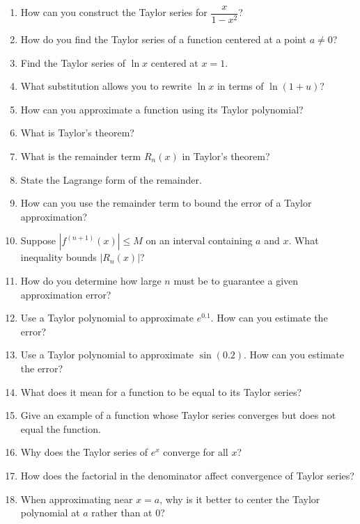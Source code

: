 \begin{enumerate}
  \item How can you construct the Taylor series for \(\dfrac{x}{1-x^{2}}\)?
  \item How do you find the Taylor series of a function centered at a point \(a \neq 0\)?
  \item Find the Taylor series of \(\ln x\) centered at \(x=1\).
  \item What substitution allows you to rewrite \(\ln x\) in terms of \(\ln(1+u)\)?
  \item How can you approximate a function using its Taylor polynomial?
  \item What is Taylor's theorem?
  \item What is the remainder term \(R_{n}(x)\) in Taylor's theorem?
  \item State the Lagrange form of the remainder.
  \item How can you use the remainder term to bound the error of a Taylor approximation?
  \item Suppose \(|f^{(n+1)}(x)| \le M\) on an interval containing \(a\) and \(x\). What inequality bounds \(|R_{n}(x)|\)?
  \item How do you determine how large \(n\) must be to guarantee a given approximation error?
  \item Use a Taylor polynomial to approximate \(e^{0.1}\). How can you estimate the error?
  \item Use a Taylor polynomial to approximate \(\sin(0.2)\). How can you estimate the error?
  \item What does it mean for a function to be equal to its Taylor series?
  \item Give an example of a function whose Taylor series converges but does not equal the function.
  \item Why does the Taylor series of \(e^{x}\) converge for all \(x\)?
  \item How does the factorial in the denominator affect convergence of Taylor series?
  \item When approximating near \(x=a\), why is it better to center the Taylor polynomial at \(a\) rather than at \(0\)?
\end{enumerate}
